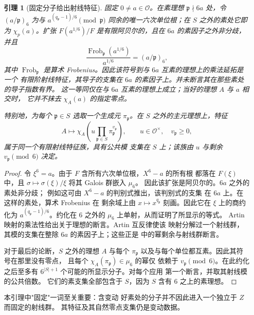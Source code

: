 \documentclass[11pt,a4paper]{article}
\numberwithin{equation}{section}
\numberwithin{figure}{section}
\newtheorem{lemma}[theorem]{引理}
\theoremstyle{definition}
\theoremstyle{remark}
\begin{document}
\begin{lemma}[固定分子给出射线特征]
\label{lem:fixed-numerator-ray}
固定 $0\ne a\in\mathcal O$。在素理想 $\mathfrak p\nmid6a$ 处，令
$(a/\mathfrak p)_6$ 为与
$a^{(q_{\mathfrak p}-1)/6}\pmod{\mathfrak p}$ 同余的唯一六次单位根；在 $S$ 之外的素处它即为
$\chi_p(a)$。扩张 $F(a^{1/6})/F$ 是有限阿贝尔的，且在
$6a$ 的素因子之外非分歧，并且
\[
 \frac{\operatorname{Frob}_{\mathfrak p}(a^{1/6})}{a^{1/6}}
       =(a/\mathfrak p)_6,
\]
其中 $\operatorname{Frob}_{\mathfrak p}$ 是算术 Frobenius。因此该符号到与 $6a$
互素的理想上的乘法延拓是一个
有限阶射线特征，其导子的支集在
$6a$ 的素因子上。并未断言其在那些素处的导子指数有界。
这一等同仅在与 $6a$ 互素的理想上成立；当好的理想 $A$ 与 $a$ 相交时，
它并不抹去 $\chi_A(a)$ 的指定零点。

特别地，为每个
$\mathfrak p\in S$ 选取一个生成元 $\pi_{\mathfrak p}$。在 $S$ 之外的主元理想上，特征
\[
 A\longmapsto\chi_A\left(u\prod_{\mathfrak p\in S}
                       \pi_{\mathfrak p}^{v_{\mathfrak p}}\right),
 \qquad u\in\mathcal O^\times,\quad v_{\mathfrak p}\ge0,
\]
属于同一个有限射线特征族，具有公共模
支集在 $S$ 上；该族由 $u$ 与剩余
$v_{\mathfrak p}\pmod6$ 决定。
\end{lemma}

\begin{proof}
令 $\xi^6=a$。由于 $F$ 含所有六次单位根，$X^6-a$ 的所有根
都落在 $F(\xi)$ 中，且
$\sigma\mapsto\sigma(\xi)/\xi$ 将其 Galois 群嵌入 $\mu_6$。
因此该扩张是阿贝尔的。$6a$ 之外的素处非分歧；
例如这可由 $X^6-a$ 的判别式推出，该判别式的支集
在 $6a$ 上。在这样的素处，算术 Frobenius 在
剩余域上由 $x\mapsto x^{q_{\mathfrak p}}$ 刻画。因此它在
$\xi$ 上的商约化为 $a^{(q_{\mathfrak p}-1)/6}$。约化在
$6$ 之外的 $\mu_6$ 上单射，从而证明了所显示的等式。
Artin 映射的乘法性给出关于理想的断言。Artin 互反律使该
映射分解过一个射线群，其模的支集在整除
$6a$ 的素因子上；这些正是
\cite[第 VIII 章，(5.3) 与 (5.5)]{MilneCFT} 中的幂剩余与射线群断言。

对于最后的论断，$S$ 之外的理想 $A$ 与每个
$\pi_{\mathfrak p}$ 以及与每个单位都互素。因此其符号在那里没有零点，
且每个 $\chi_A(\pi_{\mathfrak p})\in\mu_6$ 的幂仅
依赖于 $v_{\mathfrak p}\pmod6$。在此约化之后至多有
$6^{|S|+1}$ 个可能的所显示分子。对每个应用
第一个断言，并取其射线模的公共倍数。
它们的素支集全部包含于 $S$，因为 $S$ 含有
$6$ 之上的素理想。
\end{proof}

本引理中"固定"一词至关重要：含变动
好素处的分子并不因此进入一个独立于 $Z$ 而固定的射线群。
其特征及其自然零点支集仍是变动数据。
\end{document}
